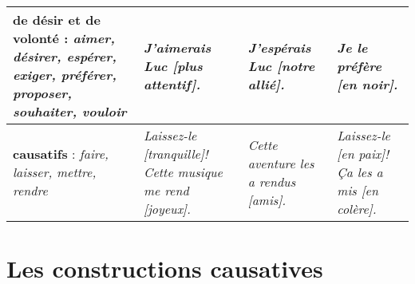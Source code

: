 \documentclass[UTF8]{report}
\begin{document}
\begin{tabular}{|p{4cm}|p{3.5cm}|p{3.5cm}|>{\RaggedRight\arraybackslash}p{3.5cm}|}
\hline
\textbf{de désir et de volonté} : \newline \textit{aimer, désirer, espérer, \newline exiger, préférer, proposer, \newline souhaiter, vouloir} & \textit{J'aimerais Luc [plus attentif].} & \textit{J'espérais Luc [notre allié].} & \textit{Je le préfère [en noir].} \\
\hline
\textbf{causatifs} : \newline \textit{faire, laisser, mettre, rendre} & \textit{Laissez-le [tranquille]!} \newline \textit{Cette musique me rend [joyeux].} & \textit{Cette aventure les a rendus [amis].} & \textit{Laissez-le [en paix]!} \newline \textit{Ça les a mis [en colère].} \\
\hline
\end{tabular}

\section{Les constructions causatives}
\end{document}
